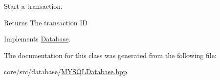 Start a transaction. 

\begin{DoxyReturn}{Returns}
The transaction ID 
\end{DoxyReturn}


Implements \hyperlink{classDatabase_afd54fc087caf27f2636f2e535691e8c2}{Database}.



The documentation for this class was generated from the following file:\begin{DoxyCompactItemize}
\item 
core/src/database/\hyperlink{MYSQLDatabase_8hpp}{MYSQLDatabase.hpp}\end{DoxyCompactItemize}

